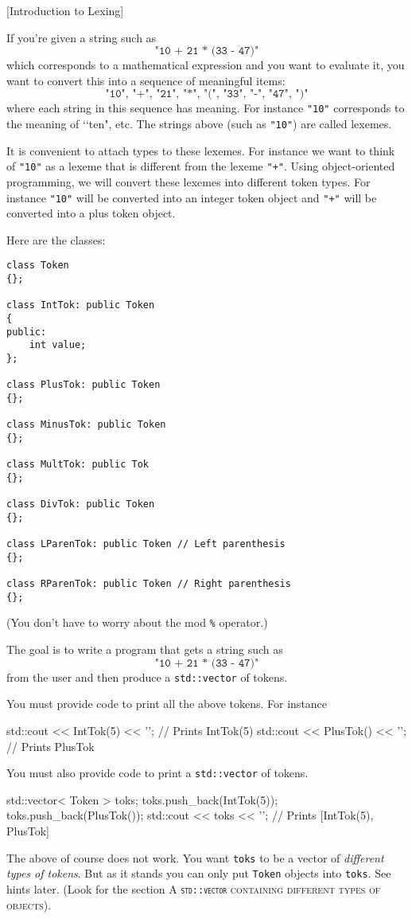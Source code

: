[Introduction to Lexing]

If you're given a string such as
\[
\texttt{"10 + 21 * (33 - 47)"}
\]
which corresponds to a mathematical expression and you want to
evaluate it, you want to convert this into a sequence of
meaningful items:
\[
\texttt{"10", "+",  "21", "*", "(", "33", "-", "47", ")"}
\]
where each string in this sequence has meaning.
For instance \texttt{"10"} corresponds to the meaning of \lq\lq ten", etc.
The strings above (such as \texttt{"10"}) are called lexemes.

It is convenient to attach types to these lexemes.
For instance we want to think of \texttt{"10"} as a lexeme that
is different from the lexeme \texttt{"+"}.
Using object-oriented programming, we will convert these
lexemes into different token types.
For instance \texttt{"10"} will be converted into an
integer token object and
\texttt{"+"} will be converted into a plus token object.

Here are the classes:
{\small
\begin{Verbatim}[frame=single,fontsize=\footnotesize]
class Token
{};

class IntTok: public Token
{
public:
    int value;
};

class PlusTok: public Token
{};

class MinusTok: public Token
{};

class MultTok: public Tok
{};

class DivTok: public Token
{};

class LParenTok: public Token // Left parenthesis
{};

class RParenTok: public Token // Right parenthesis
{};
\end{Verbatim}
}
(You don't have to worry about the mod \verb!%! operator.)

The goal is to write a program that gets a string such as
\[
\texttt{"10 + 21 * (33 - 47)"}
\]
from the user and then produce a \verb!std::vector! of tokens.

You must provide code to print all the above tokens.
For instance
\begin{console}[fontsize=\footnotesize]
std::cout << IntTok(5) << '\n'; // Prints IntTok(5)
std::cout << PlusTok() << '\n'; // Prints PlusTok
\end{console}
You must also provide code to print a \verb!std::vector! of tokens.
\begin{console}[fontsize=\footnotesize]
std::vector< Token > toks;
toks.push_back(IntTok(5));
toks.push_back(PlusTok());
std::cout << toks << '\n'; // Prints [IntTok(5), PlusTok]
\end{console}
The above of course does not work.
You want \verb!toks! to be a vector of \textit{different types of tokens}.
But as it stands you can only put \verb!Token! objects into \verb!toks!.
See hints later.
(Look for the section
\textsc{A \textnormal{\texttt{std::vector}} containing different types of objects}).

